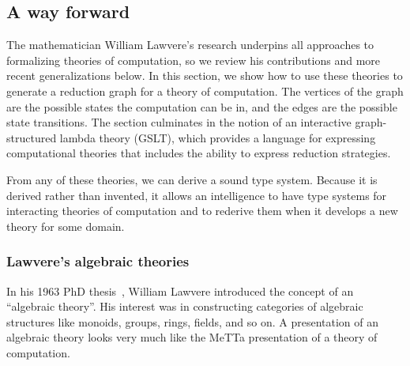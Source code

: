 \documentclass{article}
\begin{document}
\subsection{A way forward}
\label{A way forward}

The mathematician William Lawvere's research underpins all approaches to formalizing theories of computation, so we review his contributions and more recent generalizations below.  In this section, we show how to use these theories to generate a reduction graph for a theory of computation.  The vertices of the graph are the possible states the computation can be in, and the edges are the possible state transitions.  The section culminates in the notion of an interactive graph-structured lambda theory (GSLT), which provides a language for expressing computational theories that includes the ability to express reduction strategies.  

From any of these theories, we can derive a sound type system.  Because it is derived rather than invented, it allows an intelligence to have type systems for interacting theories of computation and to rederive them when it develops a new theory for some domain.

\subsubsection{Lawvere's algebraic theories}

In his 1963 PhD thesis~\cite{Lawvere1963}, William Lawvere introduced the concept of an ``algebraic theory''.  His interest was in constructing categories of algebraic structures like monoids, groups, rings, fields, and so on.  A presentation of an algebraic theory looks very much like the MeTTa presentation of a theory of computation.
\end{document}
